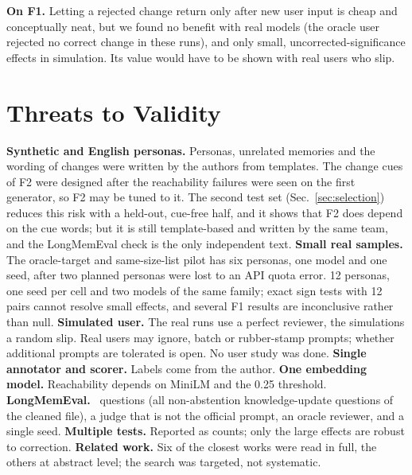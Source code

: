 \IfFileExists{IEEEtran.cls}{\documentclass[journal]{IEEEtran}\def\HAVEIEEE{1}}{\documentclass[10pt,twocolumn]{article}\usepackage[margin=0.7in,columnsep=0.25in]{geometry}}
\begin{document}
\textbf{On F1.} Letting a rejected change return only after new user input is cheap and conceptually neat, but we found no benefit with real models (the oracle user rejected no correct change in these runs), and only small, uncorrected-significance effects in simulation. Its value would have to be shown with real users who slip.

\section{Threats to Validity}
\label{sec:threats}
\textbf{Synthetic and English personas.} Personas, unrelated memories and the wording of changes were written by the authors from templates. The change cues of F2 were designed after the reachability failures were seen on the first generator, so F2 may be tuned to it. The second test set (Sec.~\ref{sec:selection}) reduces this risk with a held-out, cue-free half, and it shows that F2 does depend on the cue words; but it is still template-based and written by the same team, and the LongMemEval check is the only independent text. \textbf{Small real samples.} The oracle-target and same-size-list pilot has six personas, one model and one seed, after two planned personas were lost to an API quota error. 12 personas, one seed per cell and two models of the same family; exact sign tests with 12 pairs cannot resolve small effects, and several F1 results are inconclusive rather than null. \textbf{Simulated user.} The real runs use a perfect reviewer, the simulations a random slip. Real users may ignore, batch or rubber-stamp prompts; whether additional prompts are tolerated is open. No user study was done. \textbf{Single annotator and scorer.} Labels come from the author. \textbf{One embedding model.} Reachability depends on MiniLM and the 0.25 threshold. \textbf{LongMemEval.} \lmeQ\ questions (all non-abstention knowledge-update questions of the cleaned file), a judge that is not the official prompt, an oracle reviewer, and a single seed. \textbf{Multiple tests.} Reported as counts; only the large effects are robust to correction. \textbf{Related work.} Six of the closest works were read in full, the others at abstract level; the search was targeted, not systematic.
\end{document}
